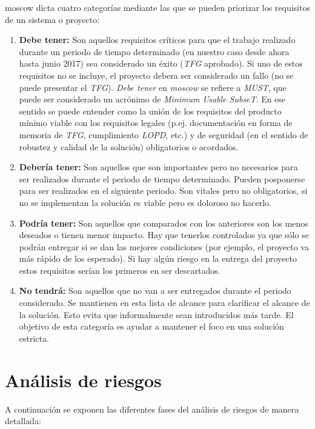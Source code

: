 \gls{moscow} dicta cuatro categorías mediante las que se pueden priorizar los requisitos de un sistema o proyecto: 

\begin{enumerate}
\item \textbf{Debe tener:} Son aquellos requisitos críticos para que el trabajo realizado durante un periodo de tiempo determinado (en nuestro caso desde ahora hasta junio 2017) sea considerado un éxito (\textit{TFG} aprobado). Si uno de estos requisitos no se incluye, el proyecto debera ser considerado un fallo (no se puede presentar el \textit{TFG}). \textit{Debe tener} en \textit{\gls{moscow}} se refiere a \textit{MUST}, que puede ser considerado un acrónimo de \textit{Minimum Usable SubseT}. En ese sentido se puede entender como la unión de los requisitos del producto mínimo viable con los requisitos legales (p.ej. documentación en forma de memoria de \textit{TFG}, cumplimiento \textit{LOPD}, etc.) y de seguridad (en el sentido de robustez y calidad de la solución) obligatorios o acordados.

\item \textbf{Debería tener:} Son aquellos que son importantes pero no necesarios para ser realizados durante el periodo de tiempo determinado. Pueden posponerse para ser realizados en el siguiente periodo. Son vitales pero no obligatorios, si no se implementan la solución es viable pero es doloroso no hacerlo.

\item \textbf{Podría tener:} Son aquellos que comparados con los anteriores son los menos deseados o tienen menor impacto. Hay que tenerlos controlados ya que sólo se podrán entregar si se dan las mejores condiciones (por ejemplo, el proyecto va más rápido de los esperado). Si hay algún riesgo en la entrega del proyecto estos requisitos serían los primeros en ser descartados.

\item \textbf{No tendrá:} Son aquellos que no van a ser entregados durante el periodo considerado. Se mantienen en esta lista de alcance para clarificar el alcance de la solución. Esto evita que informalmente sean introducidos más tarde. El objetivo de esta categoría es ayudar a mantener el foco en una solución estricta. 

\end{enumerate}

\section{Análisis de riesgos} \label{c.analisis.riesgos}
A continuación se exponen las diferentes fases del análisis de riesgos de manera detallada: 

